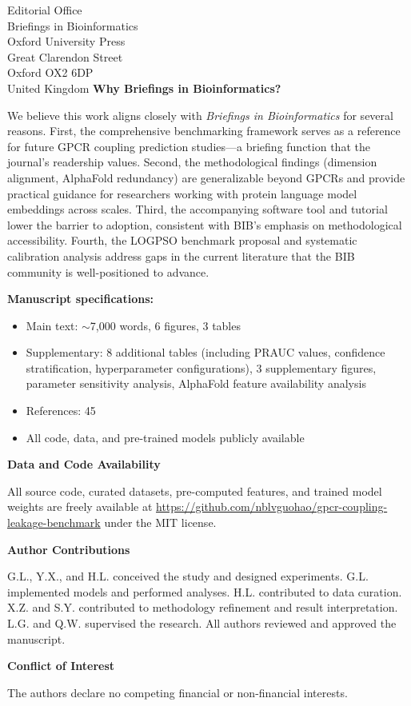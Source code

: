 \documentclass[11pt]{letter}
\begin{document}
\begin{letter}{Editorial Office\\
Briefings in Bioinformatics\\
Oxford University Press\\
Great Clarendon Street\\
Oxford OX2 6DP\\
United Kingdom}
\textbf{Why Briefings in Bioinformatics?}

We believe this work aligns closely with \textit{Briefings in Bioinformatics} for several reasons. First, the comprehensive benchmarking framework serves as a reference for future GPCR coupling prediction studies---a briefing function that the journal's readership values. Second, the methodological findings (dimension alignment, AlphaFold redundancy) are generalizable beyond GPCRs and provide practical guidance for researchers working with protein language model embeddings across scales. Third, the accompanying software tool and tutorial lower the barrier to adoption, consistent with BIB's emphasis on methodological accessibility. Fourth, the LOGPSO benchmark proposal and systematic calibration analysis address gaps in the current literature that the BIB community is well-positioned to advance.

\textbf{Manuscript specifications:}

\begin{itemize}
    \item Main text: $\sim$7,000 words, 6 figures, 3 tables
    \item Supplementary: 8 additional tables (including PRAUC values, confidence stratification, hyperparameter configurations), 3 supplementary figures, parameter sensitivity analysis, AlphaFold feature availability analysis
    \item References: 45
    \item All code, data, and pre-trained models publicly available
\end{itemize}

\textbf{Data and Code Availability}

All source code, curated datasets, pre-computed features, and trained model weights are freely available at \url{https://github.com/nblvguohao/gpcr-coupling-leakage-benchmark} under the MIT license.

\textbf{Author Contributions}

G.L., Y.X., and H.L. conceived the study and designed experiments. G.L. implemented models and performed analyses. H.L. contributed to data curation. X.Z. and S.Y. contributed to methodology refinement and result interpretation. L.G. and Q.W. supervised the research. All authors reviewed and approved the manuscript.

\textbf{Conflict of Interest}

The authors declare no competing financial or non-financial interests.


\end{letter}
\end{document}
